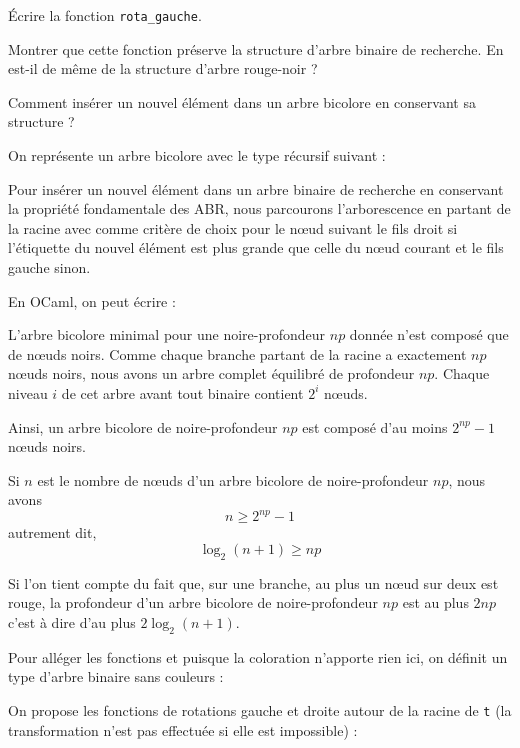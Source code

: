 Écrire la fonction \texttt{rota\_gauche}.
\smallskip

Montrer que cette fonction préserve la structure d'arbre binaire de recherche. En est-il de même de la structure d'arbre rouge-noir ?

\Q
Comment insérer un nouvel élément dans un arbre bicolore en conservant sa structure ?

\Corrige

\Q
On représente un arbre bicolore avec le type récursif suivant :



\Q
Pour insérer un nouvel élément dans un arbre binaire de recherche en conservant la propriété fondamentale des ABR, nous parcourons l'arborescence en partant de la racine avec comme critère de choix pour le nœud suivant le fils droit si l'étiquette du nouvel élément est plus grande que celle du nœud courant et le fils gauche sinon.
\medskip

En OCaml, on peut écrire :



\Q
L'arbre bicolore minimal pour une noire-profondeur $np$ donnée n'est composé que de nœuds noirs. Comme chaque branche partant de la racine a exactement $np$ nœuds noirs, nous avons un arbre complet équilibré de profondeur $np$. Chaque niveau $i$ de cet arbre avant tout binaire contient $2^i$ nœuds.
\medskip

Ainsi, un arbre bicolore de noire-profondeur $np$ est composé d'au moins $2^{np}-1$ nœuds noirs.
\medskip

Si $n$ est le nombre de nœuds d'un arbre bicolore de noire-profondeur $np$, nous avons
\[
    n \geq 2^{np}-1
\]
autrement dit,
\[
    \log_2(n+1) \geq np
\]

Si l'on tient compte du fait que, sur une branche, au plus un nœud sur deux est rouge, la profondeur d'un arbre bicolore de noire-profondeur $np$ est au plus $2np$ c'est à dire d'au plus $2\log_2(n+1)$.

\Q
Pour alléger les fonctions et puisque la coloration n'apporte rien ici, on définit un type d'arbre binaire sans couleurs :



On propose les fonctions de rotations gauche et droite autour de la racine de \texttt{t} (la transformation n'est pas effectuée si elle est impossible) :



